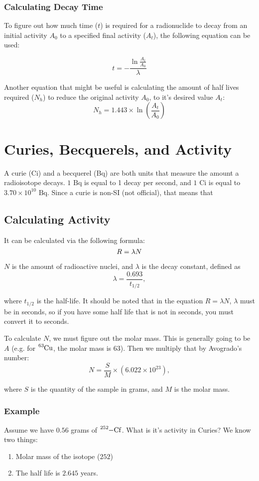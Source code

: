 \documentclass{article}
\begin{document}
\begin{multicols*}{2}
    \subsubsection{Calculating Decay Time}
    To figure out how much time ($t$) is required for a radionuclide to decay
    from an initial activity $A_0$ to a specified final activity ($A_t$), the
    following equation can be used:

    \[
      t = -\frac{\ln{\frac{A_t}{A_0}}}{\lambda}
    \]

    Another equation that might be useful is calculating the amount of half lives
    required ($N_h$) to reduce the original activity $A_0$, to it's desired value $A_t$:
    \[
      N_h = 1.443 \times \ln{\left( \frac{A_t}{A_0} \right)}
    \]

    \section{Curies, Becquerels, and Activity}
    A curie (Ci) and a becquerel (Bq) are both units that measure the amount a radioisotope
    decays. $1 \text{ Bq}$ is equal to 1 decay per second, and $1 \text{ Ci}$ is equal to
    $3.70 \times 10^{10} \text{ Bq}$. Since a curie is non-SI (not official), that means that


    \subsection{Calculating Activity}
    It can be calculated via the following formula:
    \[
      R = \lambda{N}\\
    \]

    $N$ is the amount of radioactive nuclei, and $\lambda$ is the decay constant, defined as
    \[
      \lambda = \frac{0.693}{t_{1/2}},
    \]

    where $t_{1/2}$ is the half-life. It should be noted that in the equation $R=\lambda{N}$,
    $\lambda$ must be in seconds, so if you have some half life that is not in seconds, you
    must convert it to seconds.

    To calculate $N$, we must figure out the molar mass. This is generally going to be $A$ (e.g.
    for $\ce{^{63}Cu}$, the molar mass is $63$). Then we multiply that by Avogrado's number:
    \[
      N = \frac{S}{M} \times \left(6.022 \times 10^{23}\right),
    \]

    where $S$ is the quantity of the sample in grams, and $M$ is the molar mass.

    \subsubsection{Example}
    Assume we have $0.56$ grams of $\ce{^{252}-Cf}$. What is it's activity in Curies? We know
    two things:
    \begin{enumerate}
      \item Molar mass of the isotope ($252$)
      \item The half life is $2.645$ years.
    \end{enumerate}


\end{multicols*}
\end{document}
